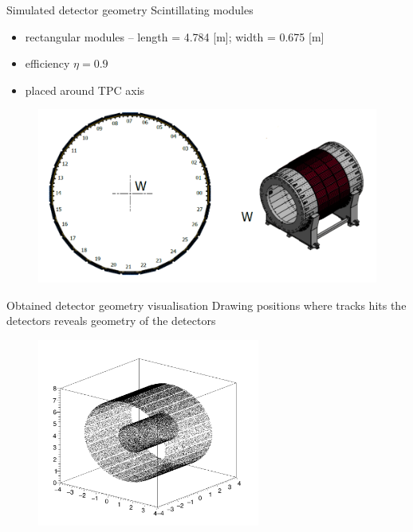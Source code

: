 \documentclass{beamer}
\begin{document}
\begin{frame}{Simulated detector geometry}
Scintillating modules
\begin{itemize}
\item rectangular modules -- length = 4.784 [m]; width = 0.675 [m] 
\item efficiency $\eta = 0.9$
\item placed around TPC axis
\end{itemize}
\begin{figure}
\includegraphics[width=\textwidth]{images/num.png}
\end{figure}
\end{frame}

\begin{frame}{Obtained detector geometry visualisation}
Drawing positions where tracks hits the detectors reveals geometry of the detectors
\begin{figure}
\includegraphics[width=0.65\textwidth]{images/all_modules.png}
\end{figure}
\end{frame}
\end{document}
